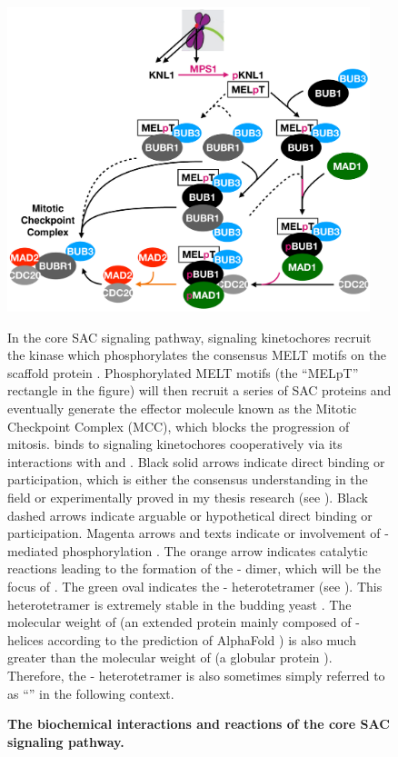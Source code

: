 \begin{figure}
    \centering
    \includegraphics[width=0.94\textwidth]{chapters/figures/CoreSAC.pdf}
    \caption{\textbf{The biochemical interactions and reactions of the core SAC signaling pathway.}}
    \noindent\justifying In the core SAC signaling pathway, signaling kinetochores recruit the kinase  which phosphorylates the consensus MELT motifs on the scaffold protein . Phosphorylated MELT motifs (the ``MELpT'' rectangle in the figure) will then recruit a series of SAC proteins and eventually generate the effector molecule known as the Mitotic Checkpoint Complex (MCC), which blocks the progression of mitosis.  binds to signaling kinetochores cooperatively via its interactions with  and  \cite{BUB1-CDC20-MAD1, Tripartite}. Black solid arrows indicate direct binding or participation, which is either the consensus understanding in the field \cite{MPS1Localization_Ji, MPS1Localization_Hiruma, RecombinantKNL1, MELTActivity, BubBiochem, BubR1TwoPools, BUB1CD1-MAD1CStructure, Faesen2017, BUB1-CDC20-MAD1, Tripartite} or experimentally proved in my thesis research (see ). Black dashed arrows indicate arguable \cite{BubBiochem, BubR1TwoPools} or hypothetical direct binding or participation. Magenta arrows and texts indicate  or involvement of -mediated phosphorylation \cite{Ji2017eLife}. The orange arrow indicates catalytic reactions leading to the formation of the - dimer, which will be the focus of . The green  oval indicates the - heterotetramer (see ). This heterotetramer is extremely stable in the budding yeast \cite{StableHeterotetramer}. The molecular weight of  (an extended protein mainly composed of \textalpha{}-helices according to the prediction of AlphaFold \cite{AlphaFold}) is also much greater than the molecular weight of  (a globular protein \cite{Structure1GO4}). Therefore, the - heterotetramer is also sometimes simply referred to as ``'' in the following context.
    \label{CoreSAC}
\end{figure}

